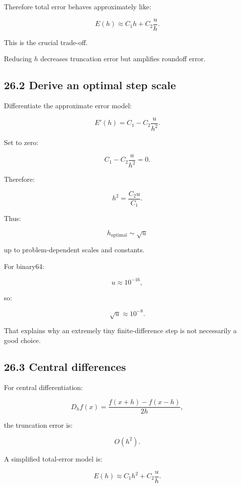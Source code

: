 Therefore total error behaves approximately like:

\[ \boxed{ E(h)\approx C_1h+C_2\frac uh }. \]

This is the crucial trade-off.

Reducing \(h\) decreases truncation error but amplifies roundoff error.

\subsection{26.2 Derive an optimal step scale}\label{02-foundations-ii-ch029-derive-an-optimal-step-scale}

\hypertarget{02-foundations-ii-ch029-derive-an-optimal-step-scale}{}

Differentiate the approximate error model:

\[ E'(h)=C_1-C_2\frac u{h^2}. \]

Set to zero:

\[ C_1-C_2\frac u{h^2}=0. \]

Therefore:

\[ h^2=\frac{C_2u}{C_1}. \]

Thus:

\[ \boxed{ h_{\mathrm{optimal}} \sim\sqrt u } \]

up to problem-dependent scales and constants.

For binary64:

\[ u\approx10^{-16}, \]

so:

\[ \sqrt u\approx10^{-8}. \]

That explains why an extremely tiny finite-difference step is not necessarily a good choice.

\subsection{26.3 Central differences}\label{02-foundations-ii-ch029-central-differences}

\hypertarget{02-foundations-ii-ch029-central-differences}{}

For central differentiation:

\[ D_hf(x)= \frac{f(x+h)-f(x-h)}{2h}, \]

the truncation error is:

\[ O(h^2). \]

A simplified total-error model is:

\[ \boxed{ E(h)\approx C_1h^2+C_2\frac uh }. \]

